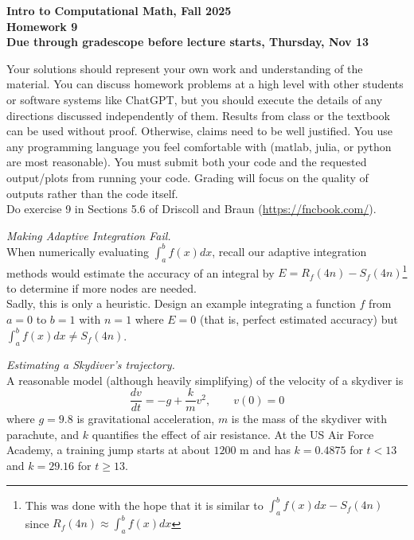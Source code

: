 \documentclass[11pt]{article}
\begin{document}
\begin{center}
{\bf Intro to Computational Math, Fall 2025\\
Homework 9\\
Due through gradescope before lecture starts, Thursday, Nov 13}
\end{center}

Your solutions should represent your own work and understanding of the material. You can discuss homework problems at a high level with other students or software systems like ChatGPT, but you should execute the details of any directions discussed independently of them. Results from class or the textbook can be used without proof. Otherwise, claims need to be well justified. You use any programming language you feel comfortable with (matlab, julia, or python are most reasonable). You must submit both your code and the requested output/plots from running your code. Grading will focus on the quality of outputs rather than the code itself.\\

 Do exercise 9 in Sections 5.6 of Driscoll and Braun (\url{https://fncbook.com/}).


\vskip1cm

 {\it Making Adaptive Integration Fail.}\\
When numerically evaluating $\int_a^b f(x)dx$, recall our adaptive integration methods would estimate the accuracy of an integral by $E= R_f(4n) - S_f(4n)$\footnote{This was done with the hope that it is similar to $\int_a^b f(x)dx - S_f(4n)$ since $R_f(4n) \approx \int_a^b f(x)dx$} to determine if more nodes are needed.\\
Sadly, this is only a heuristic. Design an example integrating a function $f$ from $a=0$ to $b=1$ with $n=1$ where $E = 0$ (that is, perfect estimated accuracy) but $\int_a^b f(x)dx \neq S_f(4n)$.

\vskip1cm

 {\it Estimating a Skydiver's trajectory.}\\
A reasonable model (although heavily simplifying) of the velocity of a skydiver is
$$ \frac{dv}{dt} = -g + \frac{k}{m}v^2, \qquad v(0)=0 $$
where $g=9.8$ is gravitational acceleration, $m$ is the mass of the skydiver with parachute, and $k$ quantifies the effect of air resistance. At the US Air Force Academy, a training jump starts at about $1200$ m and has $k=0.4875$
 for $t<13$ 
 and $k=29.16$
 for $t\geq 13$. \\
\end{document}
